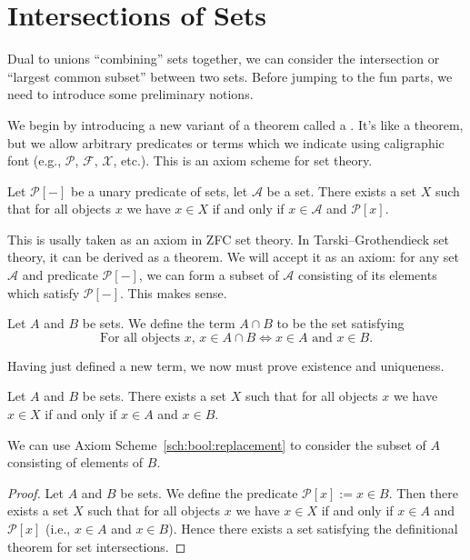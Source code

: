 \section{Intersections of Sets}

Dual to unions ``combining'' sets together, we can consider the
intersection or ``largest common subset'' between two sets. Before
jumping to the fun parts, we need to introduce some preliminary notions.

We begin by introducing a new variant of a theorem called a
. It's like a theorem, but we allow arbitrary predicates
or terms which we indicate using caligraphic font (e.g., $\mathcal{P}$,
$\mathcal{F}$, $\mathcal{X}$, etc.). This is an axiom scheme for set
theory. 

\begin{axiom-scheme}[Replacement]\label{sch:bool:replacement}
Let $\mathcal{P}[-]$ be a unary predicate of sets, let $\mathcal{A}$ be
a set.
There exists a set $X$ such that for all objects $x$ we have $x\in X$ if
and only if $x\in\mathcal{A}$ and $\mathcal{P}[x]$.
\end{axiom-scheme}

This is usally taken as an axiom in ZFC set theory. In
Tarski--Grothendieck set theory, it can be derived as a theorem. We will
accept it as an axiom: for any set $\mathcal{A}$ and predicate
$\mathcal{P}[-]$, we can form a subset of $\mathcal{A}$ consisting of
its elements which satisfy $\mathcal{P}[-]$. This makes sense.

\begin{definition}
Let $A$ and $B$ be sets. We define the term $A\cap B$ to be the set
satisfying
\begin{equation}
\mbox{For all objects $x$, }x\in A\cap B\iff x\in A\mbox{ and }x\in B.
\end{equation}
\end{definition}

Having just defined a new term, we now must prove existence and
uniqueness.

\begin{theorem}
Let $A$ and $B$ be sets. There exists a set $X$ such that for all
objects $x$ we have $x\in X$ if and only if $x\in A$ and $x\in B$.
\end{theorem}

We can use Axiom Scheme~\ref{sch:bool:replacement} to consider the
subset of $A$ consisting of elements of $B$.

\begin{proof}
Let $A$ and $B$ be sets. We define the predicate $\mathcal{P}[x]:=x\in B$.
Then there exists a set $X$ such that for all objects $x$ we have $x\in X$
if and only if $x\in A$ and $\mathcal{P}[x]$ (i.e., $x\in A$ and $x\in B$).
Hence there exists a set satisfying the definitional theorem for set
intersections. 
\end{proof}

